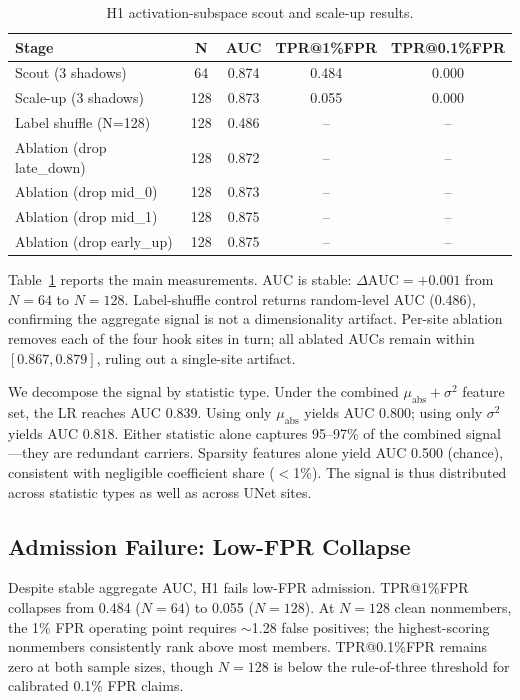 \documentclass[10pt,conference]{IEEEtran}
\begin{document}
\begin{table}[t]
\caption{H1 activation-subspace scout and scale-up results.}
\label{tab:h1-results}
\centering
\begin{tabular}{lcccc}
\toprule
Stage & N & AUC & TPR@1\%FPR & TPR@0.1\%FPR \\
\midrule
Scout (3 shadows)   & 64  & 0.874 & 0.484 & 0.000 \\
Scale-up (3 shadows)& 128 & 0.873 & 0.055 & 0.000 \\
\midrule
Label shuffle (N=128) & 128 & 0.486 & -- & -- \\
Ablation (drop late\_down) & 128 & 0.872 & -- & -- \\
Ablation (drop mid\_0)     & 128 & 0.873 & -- & -- \\
Ablation (drop mid\_1)     & 128 & 0.875 & -- & -- \\
Ablation (drop early\_up)  & 128 & 0.875 & -- & -- \\
\bottomrule
\end{tabular}
\end{table}

Table~\ref{tab:h1-results} reports the main measurements. AUC is stable:
$\Delta\text{AUC} = +0.001$ from $N=64$ to $N=128$. Label-shuffle control
returns random-level AUC (0.486), confirming the aggregate signal is not a
dimensionality artifact. Per-site ablation removes each of the four hook
sites in turn; all ablated AUCs remain within $[0.867, 0.879]$, ruling out
a single-site artifact.

We decompose the signal by statistic type. Under the combined
$\mu_{\text{abs}}{+}\sigma^2$ feature set, the LR reaches AUC 0.839.
Using only $\mu_{\text{abs}}$ yields AUC 0.800; using only $\sigma^2$
yields AUC 0.818. Either statistic alone captures 95--97\% of the
combined signal---they are redundant carriers. Sparsity features alone
yield AUC 0.500 (chance), consistent with negligible coefficient share
($<$1\%). The signal is thus distributed across statistic types as well
as across UNet sites.

\subsection{Admission Failure: Low-FPR Collapse}

Despite stable aggregate AUC, H1 fails low-FPR admission. TPR@1\%FPR
collapses from 0.484 ($N=64$) to 0.055 ($N=128$). At $N=128$ clean
nonmembers, the 1\% FPR operating point requires $\sim$1.28 false
positives; the highest-scoring nonmembers consistently rank above most
members. TPR@0.1\%FPR remains zero at both sample sizes, though $N=128$
is below the rule-of-three threshold for calibrated 0.1\% FPR claims.
\end{document}
